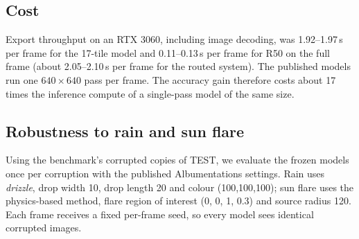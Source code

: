 \begin{table}[t]
\centering
\caption{Per-class TEST AP@0.3. Ours: unrouted tiled model, mean and range over three seeds.}
\label{tab:perclass}
\small
{}
\end{table}

\subsection{Cost}
Export throughput on an RTX 3060, including image decoding, was 1.92--1.97\,s per frame for the 17-tile model and 0.11--0.13\,s per frame for R50 on the full frame (about 2.05--2.10\,s per frame for the routed system). The published models run one $640\times640$ pass per frame. The accuracy gain therefore costs about 17 times the inference compute of a single-pass model of the same size.

\subsection{Robustness to rain and sun flare}\label{sec:robust}
Using the benchmark's corrupted copies of TEST, we evaluate the frozen models once per corruption with the published Albumentations \citep{buslaev2020albumentations} settings. Rain uses \emph{drizzle}, drop width 10, drop length 20 and colour (100,100,100); sun flare uses the physics-based method, flare region of interest (0, 0, 1, 0.3) and source radius 120. Each frame receives a fixed per-frame seed, so every model sees identical corrupted images. 
